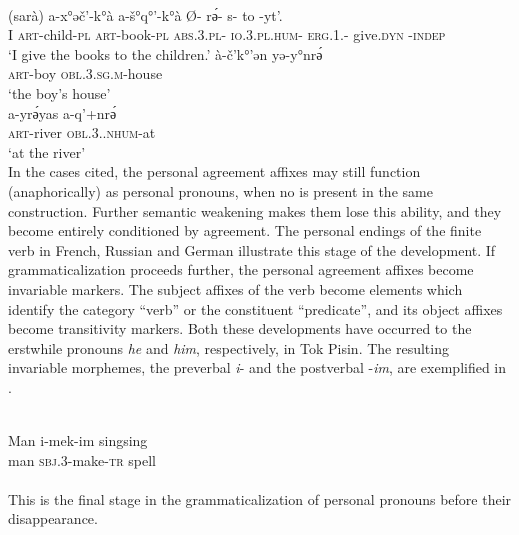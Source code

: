 \ea\label{ex:E10}
\langinfo{\LangAbkh}{}{} \\
 \ea
 \gll (sarà)  a-x°əč'-k°à                  a-š°q°'-k°à                          Ø- r\'ә- s- to -yt'.\\
I            \textsc{art}-child-\textsc{pl}  \textsc{art}-book-\textsc{pl}  \textsc{abs}.3.\textsc{pl}- \textsc{io}.3.\textsc{pl}.\textsc{hum}- \textsc{erg}.1.\glsg- give.\textsc{dyn} -\textsc{indep}\\
\glt ‘I give the books to the children.’
\ex 
\gll à-č'k°'ən  yə-y°nr\'ә\\
 \textsc{art}-boy  \textsc{obl}.3.\textsc{sg.m}-house\\
\glt ‘the boy's house’\\
\ex
\gll a-yr\'әyas  a-q'+nr\'ә\\
 \textsc{art}-river  \textsc{obl}.3.\glsg.\textsc{nhum}-at\\
\glt ‘at the river’\\
\z
\z
\noindent In the cases cited, the personal agreement affixes may still function (anaphorically) as personal pronouns, when no \np is present in the same construction. Further semantic weakening makes them lose this ability, and they become entirely conditioned by agreement. The personal endings of the finite verb in French, Russian and German illustrate this stage of the development. If grammaticalization proceeds further, the personal agreement affixes become invariable markers. The subject affixes of the verb become elements which identify the category ``verb'' or the constituent ``predicate'', and its object affixes become transitivity markers. Both these developments have occurred to the erstwhile pronouns \textit{he} and \textit{him}, respectively, in Tok Pisin. The resulting invariable morphemes, the preverbal \textit{i}{}- and the postverbal -\textit{im}, are exemplified in .

\ea\label{ex:E11}
 \\
\gll  Man  i-mek-im  singsing\\
man  \textsc{sbj}.3-make-\textsc{tr}  spell\\
 \\
\z
\noindent This is the final stage in the grammaticalization of personal pronouns before their disappearance.

